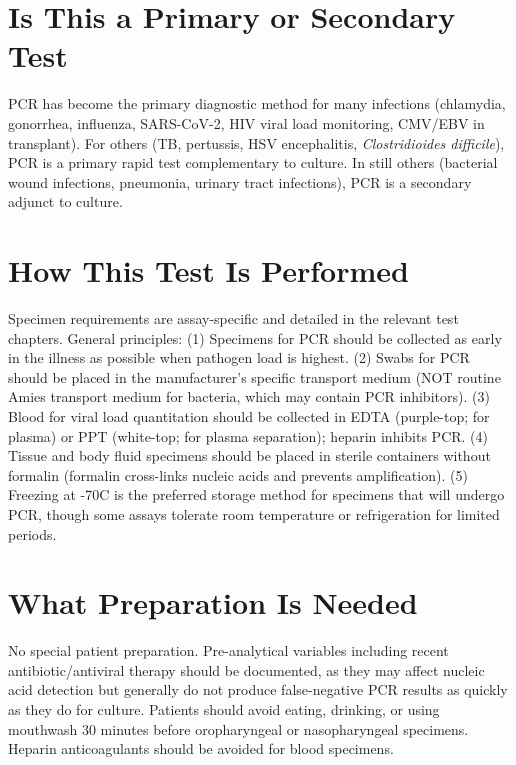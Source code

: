 \section*{Is This a Primary or Secondary Test}
PCR has become the primary diagnostic method for many infections (chlamydia, gonorrhea, influenza, SARS-CoV-2, HIV viral load monitoring, CMV/EBV in transplant). For others (TB, pertussis, HSV encephalitis, \textit{Clostridioides difficile}), PCR is a primary rapid test complementary to culture. In still others (bacterial wound infections, pneumonia, urinary tract infections), PCR is a secondary adjunct to culture.

\section*{How This Test Is Performed}
Specimen requirements are assay-specific and detailed in the relevant test chapters. General principles: (1) Specimens for PCR should be collected as early in the illness as possible when pathogen load is highest. (2) Swabs for PCR should be placed in the manufacturer's specific transport medium (NOT routine Amies transport medium for bacteria, which may contain PCR inhibitors). (3) Blood for viral load quantitation should be collected in EDTA (purple-top; for plasma) or PPT (white-top; for plasma separation); heparin inhibits PCR. (4) Tissue and body fluid specimens should be placed in sterile containers without formalin (formalin cross-links nucleic acids and prevents amplification). (5) Freezing at -70\textdegree{}C is the preferred storage method for specimens that will undergo PCR, though some assays tolerate room temperature or refrigeration for limited periods.

\section*{What Preparation Is Needed}
No special patient preparation. Pre-analytical variables including recent antibiotic/antiviral therapy should be documented, as they may affect nucleic acid detection but generally do not produce false-negative PCR results as quickly as they do for culture. Patients should avoid eating, drinking, or using mouthwash 30 minutes before oropharyngeal or nasopharyngeal specimens. Heparin anticoagulants should be avoided for blood specimens.

